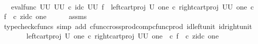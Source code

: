 \begin{isabellebody}
\ \ \isamarkupfalse%
\ \isamarkupfalse%
\ {\isachardoublequoteopen}{\isachardot}{\kern0pt}{\isachardot}{\kern0pt}{\isachardot}{\kern0pt}\ {\isacharequal}{\kern0pt}\ {\isacharparenleft}{\kern0pt}eval{\isacharunderscore}{\kern0pt}func\ {\isacharparenleft}{\kern0pt}U\isactrlbsup U\isactrlesup {\isacharparenright}{\kern0pt}\ {\isacharparenleft}{\kern0pt}U\isactrlbsup U\isactrlesup {\isacharparenright}{\kern0pt}{\isacharparenright}{\kern0pt}\ {\isasymcirc}\isactrlsub c\ {\isacharparenleft}{\kern0pt}id\isactrlsub c\ {\isacharparenleft}{\kern0pt}U\isactrlbsup U\isactrlesup {\isacharparenright}{\kern0pt}\ {\isasymtimes}\isactrlsub f\ \ {\isacharparenleft}{\kern0pt}{\isacharparenleft}{\kern0pt}left{\isacharunderscore}{\kern0pt}cart{\isacharunderscore}{\kern0pt}proj\ {\isacharparenleft}{\kern0pt}U{\isacharparenright}{\kern0pt}\ one{\isacharparenright}{\kern0pt}\isactrlsup {\isasymsharp}\ {\isasymcirc}\isactrlsub c\ {\isacharparenleft}{\kern0pt}right{\isacharunderscore}{\kern0pt}cart{\isacharunderscore}{\kern0pt}proj\ {\isacharparenleft}{\kern0pt}U\isactrlbsup U\isactrlesup {\isacharparenright}{\kern0pt}\ one{\isacharparenright}{\kern0pt}{\isacharparenright}{\kern0pt}\isactrlsup {\isasymsharp}{\isacharparenright}{\kern0pt}\ {\isasymcirc}\isactrlsub c\ {\isasymlangle}f\ \ {\isasymcirc}\isactrlsub c\ z{\isacharcomma}{\kern0pt}id\isactrlsub c\ one{\isasymrangle}{\isachardoublequoteclose}\isanewline
\ \ \ \ \isamarkupfalse%
\ assms\ \isamarkupfalse%
\ {\isacharparenleft}{\kern0pt}typecheck{\isacharunderscore}{\kern0pt}cfuncs{\isacharcomma}{\kern0pt}\ simp\ add{\isacharcolon}{\kern0pt}\ cfunc{\isacharunderscore}{\kern0pt}cross{\isacharunderscore}{\kern0pt}prod{\isacharunderscore}{\kern0pt}comp{\isacharunderscore}{\kern0pt}cfunc{\isacharunderscore}{\kern0pt}prod\ id{\isacharunderscore}{\kern0pt}left{\isacharunderscore}{\kern0pt}unit{}\ id{\isacharunderscore}{\kern0pt}right{\isacharunderscore}{\kern0pt}unit{}{\isacharparenright}{\kern0pt}\isanewline
\ \ \isamarkupfalse%
\ \isamarkupfalse%
\ {\isachardoublequoteopen}{\isachardot}{\kern0pt}{\isachardot}{\kern0pt}{\isachardot}{\kern0pt}\ {\isacharequal}{\kern0pt}\ {\isacharparenleft}{\kern0pt}left{\isacharunderscore}{\kern0pt}cart{\isacharunderscore}{\kern0pt}proj\ {\isacharparenleft}{\kern0pt}U{\isacharparenright}{\kern0pt}\ one{\isacharparenright}{\kern0pt}\isactrlsup {\isasymsharp}\ {\isasymcirc}\isactrlsub c\ {\isacharparenleft}{\kern0pt}right{\isacharunderscore}{\kern0pt}cart{\isacharunderscore}{\kern0pt}proj\ {\isacharparenleft}{\kern0pt}U\isactrlbsup U\isactrlesup {\isacharparenright}{\kern0pt}\ one{\isacharparenright}{\kern0pt}\ \ {\isasymcirc}\isactrlsub c\ {\isasymlangle}f\ \ {\isasymcirc}\isactrlsub c\ z{\isacharcomma}{\kern0pt}id\isactrlsub c\ one{\isasymrangle}{\isachardoublequoteclose}\isanewline

\end{isabellebody}
